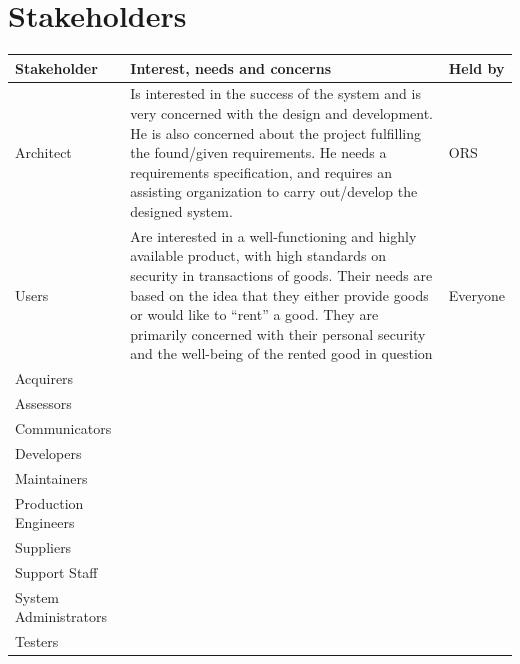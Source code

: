 \documentclass[a4paper,11pt]{report}
\begin{document}
\section{Stakeholders}
\label{sec:stakeholders}
\begin{center}
  \begin{tabular}[h]{| l |  l | l|}
    \hline
    \textbf{Stakeholder} & \textbf{Interest, needs and concerns} & \textbf{Held
        by} \\
    \hline
    Architect & Is interested in the success of the system and is very concerned
        with the design and development. He is also concerned about the project 
        fulfilling the found/given requirements. He needs a requirements
        specification, and requires an assisting organization to carry
        out/develop the designed system. & ORS \\
    \hline
    Users &  Are interested in a well-functioning and highly available product,
        with high standards on security in transactions of goods. Their needs
        are based on the idea that they either provide goods or would like to
        ``rent'' a good. They are primarily concerned with their personal
        security and the well-being of the rented good in question & Everyone \\
    \hline
    Acquirers & & \\
    \hline
    Assessors & & \\
    \hline
    Communicators & & \\
    \hline
    Developers & & \\
    \hline
    Maintainers & & \\
    \hline
    Production Engineers & & \\
    \hline
    Suppliers & & \\
    \hline
    Support Staff & & \\
    \hline
    System Administrators & & \\
    \hline
    Testers & & \\
    \hline
  \end{tabular}
\end{center}
\end{document}
